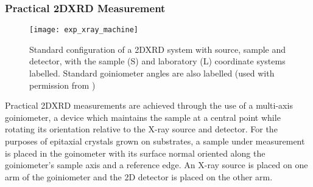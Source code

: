 \subsubsection{Practical 2DXRD Measurement}
\begin{figure}
 \centering \texttt{[image: exp\_xray\_machine]}
 \caption[Typical 2DXRD experimental implementation]{\label{fig:exp_xray_machine}Standard configuration of a 2DXRD system with source, sample and detector, with the sample (S) and laboratory (L) coordinate systems labelled. Standard goiniometer angles are also labelled (used with permission from \cite{He2009})}
\end{figure}
Practical 2DXRD measurements are achieved through the use of a multi-axis goiniometer, a device which maintains the sample at a central point while rotating its orientation relative to the X-ray source and detector.
For the purposes of epitaxial crystals grown on substrates, a sample under measurement is placed in the goinometer with its surface normal oriented along the goiniometer's sample axis and a reference edge.
An X-ray source is placed on one arm of the goiniometer and the 2D detector is placed on the other arm.

